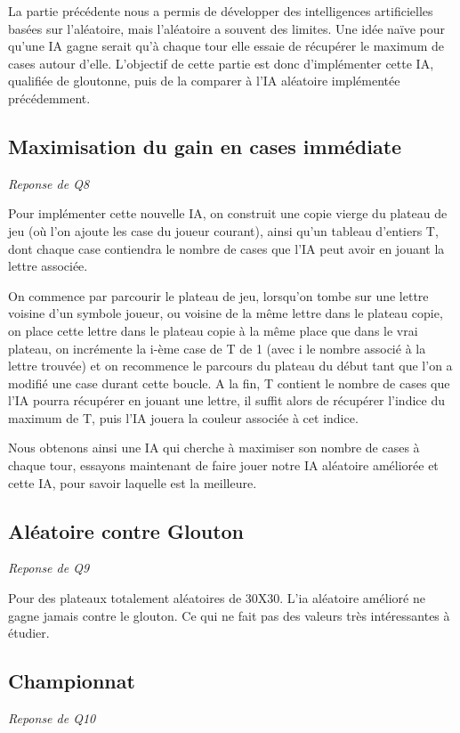 \documentclass[a4paper,11pt]{article}
\begin{document}
La partie précédente nous a permis de développer des intelligences artificielles
basées sur l'aléatoire, mais l'aléatoire a souvent des limites. Une idée naïve pour
qu'une IA gagne serait qu'à chaque tour elle essaie de récupérer le maximum de cases
autour d'elle. L'objectif de cette partie est donc d'implémenter cette IA, qualifiée 
de gloutonne, puis de la comparer à l'IA aléatoire implémentée précédemment.


\subsection{Maximisation du gain en cases immédiate}
\emph{Reponse de Q8}

Pour implémenter cette nouvelle IA, on construit une copie vierge du plateau de jeu (où l'on ajoute les case du joueur courant),
ainsi qu'un tableau d'entiers T, dont chaque case contiendra le nombre de cases que l'IA peut
avoir en jouant la lettre associée. 

On commence par parcourir le plateau de jeu, lorsqu'on tombe sur une lettre voisine
d'un symbole joueur, ou voisine de la même lettre dans le plateau copie, on place cette
lettre dans le plateau copie à la même place que dans le vrai plateau, on incrémente
la i-ème case de T de 1 (avec i le nombre associé à la lettre trouvée) et on 
recommence le parcours du plateau du début tant que l'on a modifié une case durant cette boucle. A la fin, T contient le nombre de cases
que l'IA pourra récupérer en jouant une lettre, il suffit alors de récupérer l'indice
du maximum de T, puis l'IA jouera la couleur associée à cet indice. 

Nous obtenons ainsi une IA qui cherche à maximiser son nombre de cases à chaque tour,
essayons maintenant de faire jouer notre IA aléatoire améliorée et cette IA, pour
savoir laquelle est la meilleure.

\subsection{Aléatoire contre Glouton}
\emph{Reponse de Q9}

Pour des plateaux totalement aléatoires de 30X30. L'ia aléatoire amélioré ne gagne jamais contre le glouton. Ce qui ne fait pas des valeurs très intéressantes à étudier.

\subsection{Championnat}
\emph{Reponse de Q10}
\end{document}
